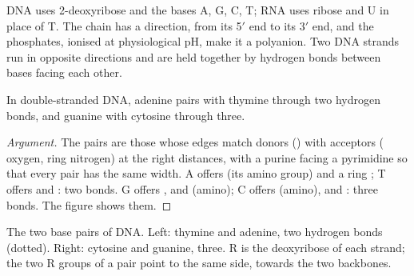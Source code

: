 DNA uses 2-deoxyribose and the bases A, G, C, T; RNA uses ribose and U in place of T. The chain has a
direction, from its 5$'$ end to its 3$'$ end, and the phosphates, ionised at physiological pH, make it a
polyanion. Two DNA strands run in opposite directions and are held together by hydrogen bonds between
bases facing each other.

\begin{proposition}\label{prop:b2:biomolecules:pairing}
In double-stranded DNA, adenine pairs with thymine through two hydrogen bonds, and guanine with cytosine
through three.
\end{proposition}

\begin{proof}[Argument]
The pairs are those whose edges match donors () with acceptors ( oxygen, ring
nitrogen) at the right distances, with a purine facing a pyrimidine so that every pair has the same
width. A offers  (its amino group) and a ring ; T offers  and : two bonds. G
offers ,  and  (amino); C offers  (amino),  and : three
bonds. The figure shows them.
\end{proof}

\begin{omfigure}
%
\hspace{2.3em}%
\hspace{1.5em}
%
\hspace{2.3em}%
\par\vspace{6pt}

{\small The two base pairs of DNA. Left: thymine and adenine, two hydrogen bonds (dotted). Right:
cytosine and guanine, three. R is the deoxyribose of each strand; the two R groups of a pair point to
the same side, towards the two backbones.}
\end{omfigure}

